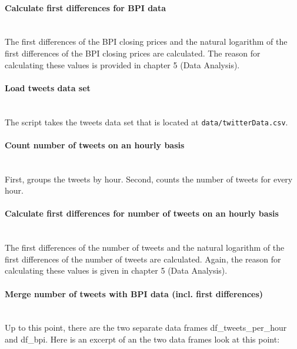 \documentclass[a4paper,12pt]{article}
\begin{document}
\begin{spacing}{1.2}
\paragraph{Calculate first differences for BPI data}\mbox{}\\
The first differences of the BPI closing prices and the natural logarithm of the first differences of the BPI closing prices are calculated. The reason for calculating these values is provided in chapter 5 (Data Analysis).

\paragraph{Load tweets data set}\mbox{}\\ 
The script takes the tweets data set that is located at \verb|data/twitterData.csv|.

\paragraph{Count number of tweets on an hourly basis}\mbox{}\\ First, groups the tweets by hour. Second, counts the number of tweets for every hour.

\paragraph{Calculate first differences for number of tweets on an hourly basis}\mbox{}\\ 
The first differences of the number of tweets and the natural logarithm of the first differences of the number of tweets are calculated. Again, the reason for calculating these values is given in chapter 5 (Data Analysis).

\paragraph{Merge number of tweets with BPI data (incl. first differences)}\mbox{}\\
Up to this point, there are the two separate data frames df\_tweets\_per\_hour and df\_bpi. Here is an excerpt of an the two data frames look at this point:


\end{spacing}
\end{document}
